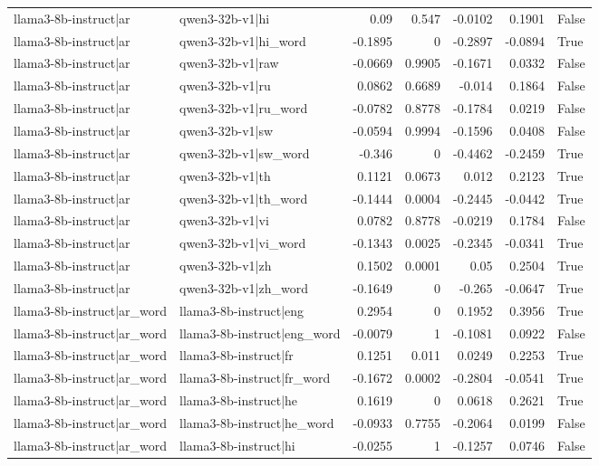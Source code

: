 \begin{table}
\begin{tabular}{l l r r r r l}
llama3-8b-instruct|ar & qwen3-32b-v1|hi & 0.09 & 0.547 & -0.0102 & 0.1901 & False \\
llama3-8b-instruct|ar & qwen3-32b-v1|hi_word & -0.1895 & 0 & -0.2897 & -0.0894 & True \\
llama3-8b-instruct|ar & qwen3-32b-v1|raw & -0.0669 & 0.9905 & -0.1671 & 0.0332 & False \\
llama3-8b-instruct|ar & qwen3-32b-v1|ru & 0.0862 & 0.6689 & -0.014 & 0.1864 & False \\
llama3-8b-instruct|ar & qwen3-32b-v1|ru_word & -0.0782 & 0.8778 & -0.1784 & 0.0219 & False \\
llama3-8b-instruct|ar & qwen3-32b-v1|sw & -0.0594 & 0.9994 & -0.1596 & 0.0408 & False \\
llama3-8b-instruct|ar & qwen3-32b-v1|sw_word & -0.346 & 0 & -0.4462 & -0.2459 & True \\
llama3-8b-instruct|ar & qwen3-32b-v1|th & 0.1121 & 0.0673 & 0.012 & 0.2123 & True \\
llama3-8b-instruct|ar & qwen3-32b-v1|th_word & -0.1444 & 0.0004 & -0.2445 & -0.0442 & True \\
llama3-8b-instruct|ar & qwen3-32b-v1|vi & 0.0782 & 0.8778 & -0.0219 & 0.1784 & False \\
llama3-8b-instruct|ar & qwen3-32b-v1|vi_word & -0.1343 & 0.0025 & -0.2345 & -0.0341 & True \\
llama3-8b-instruct|ar & qwen3-32b-v1|zh & 0.1502 & 0.0001 & 0.05 & 0.2504 & True \\
llama3-8b-instruct|ar & qwen3-32b-v1|zh_word & -0.1649 & 0 & -0.265 & -0.0647 & True \\
llama3-8b-instruct|ar_word & llama3-8b-instruct|eng & 0.2954 & 0 & 0.1952 & 0.3956 & True \\
llama3-8b-instruct|ar_word & llama3-8b-instruct|eng_word & -0.0079 & 1 & -0.1081 & 0.0922 & False \\
llama3-8b-instruct|ar_word & llama3-8b-instruct|fr & 0.1251 & 0.011 & 0.0249 & 0.2253 & True \\
llama3-8b-instruct|ar_word & llama3-8b-instruct|fr_word & -0.1672 & 0.0002 & -0.2804 & -0.0541 & True \\
llama3-8b-instruct|ar_word & llama3-8b-instruct|he & 0.1619 & 0 & 0.0618 & 0.2621 & True \\
llama3-8b-instruct|ar_word & llama3-8b-instruct|he_word & -0.0933 & 0.7755 & -0.2064 & 0.0199 & False \\
llama3-8b-instruct|ar_word & llama3-8b-instruct|hi & -0.0255 & 1 & -0.1257 & 0.0746 & False \\

\end{tabular}
\end{table}
